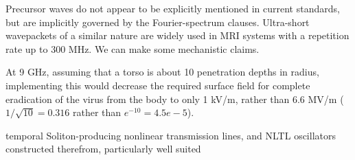 \documentclass[paper.tex]{subfiles}
\begin{document}
Precursor waves do not appear to be explicitly mentioned in current standards, but are implicitly governed by the Fourier-spectrum clauses. Ultra-short wavepackets of a similar nature are widely used in MRI systems with a repetition rate up to 300 MHz. We can make some mechanistic claims.

At 9 GHz, assuming that a torso is about 10 penetration depths in radius, implementing this would decrease the required surface field for complete eradication of the virus from the body to only 1 kV/m, rather than 6.6 MV/m ($1/\sqrt{10}=0.316$ rather than $e^{-10}=4.5e-5$). 



temporal Soliton-producing nonlinear transmission lines, and NLTL oscillators constructed therefrom, particularly well suited 
\end{document}
